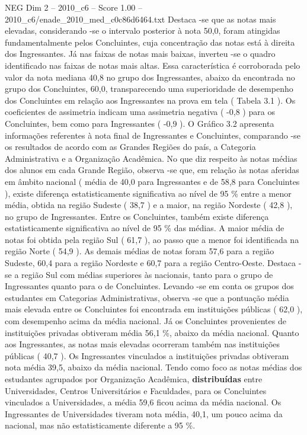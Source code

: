 \begin{textsample}{NEG Dim 2 – 2010\_c6 – Score 1.00 – 2010\_c6/enade\_2010\_med\_c0c86d6464.txt}
Destaca -se que as notas mais elevadas, considerando -se o intervalo posterior à nota 50,0, foram atingidas fundamentalmente pelos Concluintes, cuja concentração das notas está à direita dos Ingressantes.
Já nas faixas de notas mais baixas, inverteu -se o quadro identificado nas faixas de notas mais altas.
Essa característica é corroborada pelo valor da nota mediana 40,8 no grupo dos Ingressantes, abaixo da encontrada no grupo dos Concluintes, 60,0, transparecendo uma superioridade de desempenho dos Concluintes em relação aos Ingressantes na prova em tela ( Tabela 3.1 ).
Os coeficientes de assimetria indicam uma assimetria negativa ( -0,8 ) para os Concluintes, bem como para Ingressantes ( -0,9 ).
O Gráfico 3.2 apresenta informações referentes à nota final de Ingressantes e Concluintes, comparando -se os resultados de acordo com as Grandes Regiões do país, a Categoria Administrativa e a Organização Acadêmica.
No que diz respeito às notas médias dos alunos em cada Grande Região, observa -se que, em relação às notas aferidas em âmbito nacional ( média de 40,0 para Ingressantes e de 58,8 para Concluintes ), existe diferença estatisticamente significativa ao nível de 95 \% entre a menor média, obtida na região Sudeste ( 38,7 ) e a maior, na região Nordeste ( 42,8 ), no grupo de Ingressantes.
Entre os Concluintes, também existe diferença estatisticamente significativa ao nível de 95 \% das médias.
A maior média de notas foi obtida pela região Sul ( 61,7 ), ao passo que a menor foi identificada na região Norte ( 54,9 ).
As demais médias de notas foram 57,6 para a região Sudeste, 60,4 para a região Nordeste e 60,7 para a região Centro-Oeste.
Destaca -se a região Sul com médias superiores às nacionais, tanto para o grupo de Ingressantes quanto para o de Concluintes.
Levando -se em conta os grupos dos estudantes em Categorias Administrativas, observa -se que a pontuação média mais elevada entre os Concluintes foi encontrada em instituições públicas ( 62,0 ), com desempenho acima da média nacional.
Já os Concluintes provenientes de instituições privadas obtiveram média 56,1 \%, abaixo da média nacional.
Quanto aos Ingressantes, as notas mais elevadas ocorreram também nas instituições públicas ( 40,7 ).
Os Ingressantes vinculados a instituições privadas obtiveram nota média 39,5, abaixo da média nacional.
Tendo como foco as notas médias dos estudantes agrupados por Organização Acadêmica, \textbf{distribuídas} entre Universidades, Centros Universitários e Faculdades, para os Concluintes vinculados a Universidades, a média 59,6 ficou acima da média nacional.
Os Ingressantes de Universidades tiveram nota média, 40,1, um pouco acima da nacional, mas não estatisticamente diferente a 95 \%.

\end{textsample}
